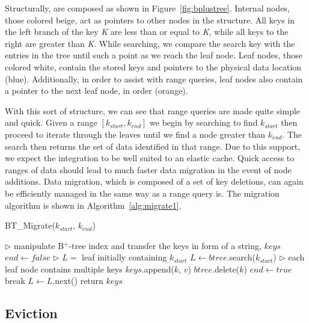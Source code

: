Structurally, \bptrees are composed as shown in Figure~\ref{fig:bplustree}.
Internal nodes, those colored beige, act as pointers to other nodes in the
structure. All keys in the left branch of the key \emph{K} are less than or
equal to \emph{K}, while all keys to the right are greater than \emph{K}. While
searching, we compare the search key with the entries in the tree until such a
point as we reach the leaf node. Leaf nodes, those colored white, contain the
stored keys and pointers to the physical data location (blue). Additionally, in
order to assist with range queries, leaf nodes also contain a pointer to the
next leaf node, in order (orange).

With this sort of structure, we can see that range queries are made quite
simple and quick. Given a range $[k_{start}, k_{end}]$ we begin by searching to
find $k_{start}$ then proceed to iterate through the leaves until we find a
node greater than $k_{end}$. The search then returns the set of data identified
in that range. Due to this support, we expect the \bptree integration to be
well suited to an elastic cache. Quick access to ranges of data should lead to
much faster data migration in the event of node additions. Data migration,
which is composed of a set of key deletions, can again be efficiently managed
in the same way as a range query is. The \bptree migration algorithm is shown
in Algorithm~\ref{alg:migrate1}.

\begin{algorithm}[htp]
\small
\caption{\label{alg:migrate1}BT\_Migrate($k_{start}$, $k_{end}$)} \begin{algorithmic}[1]
\STATE $\triangleright$ manipulate B$^+$-tree index and transfer the keys in form of a string, $keys$
\STATE $end \leftarrow false$
\STATE $\triangleright$ $L =$ leaf initially containing $k_{start}$ 
\STATE $L \leftarrow btree$.search($k_{start}$)
 \STATE $\triangleright$ each leaf node contains multiple keys
     \STATE $keys$.append($k$, $v$)
     \STATE $btree$.delete($k$)
   \ELSE
     \STATE $end \leftarrow true$
     \STATE break
   \ENDIF
 \ENDFOR
 \STATE $L \leftarrow L$.next()
\ENDWHILE
\STATE return $keys$
\end{algorithmic}
\end{algorithm}



\subsection{Eviction} %
\label{sub:cache_eviction}

